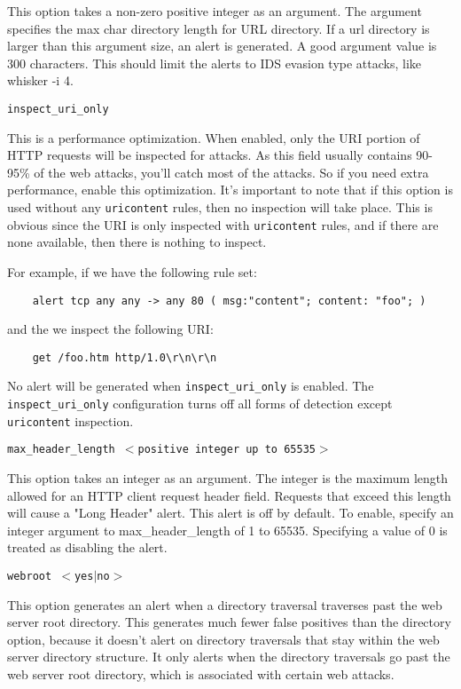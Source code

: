 \documentclass[english]{report}
\newcounter{slistnum}
\newenvironment{slist}
{ \begin{list}{ {\bf \arabic{slistnum}.} }{\usecounter{slistnum} } }
{ \end{list} }
\begin{document}
\begin{slist}
This option takes a non-zero positive integer as an argument.  The argument
specifies the max char directory length for URL directory.  If a url directory
is larger than this argument size, an alert is generated. A good argument value
is 300 characters.  This should limit the alerts to IDS evasion type attacks,
like whisker -i 4.

\item \texttt{inspect\_uri\_only}

This is a performance optimization.  When enabled, only the URI portion of HTTP
requests will be inspected for attacks.  As this field usually contains 90-95\%
of the web attacks, you'll catch most of the attacks.  So if you need extra
performance, enable this optimization.  It's important to note that if this
option is used without any \texttt{uricontent} rules, then no inspection will
take place.  This is obvious since the URI is only inspected with
\texttt{uricontent} rules, and if there are none available, then there is
nothing to inspect.

For example, if we have the following rule set:

\begin{verbatim}
    alert tcp any any -> any 80 ( msg:"content"; content: "foo"; )
\end{verbatim}

and the we inspect the following URI:

\begin{verbatim}
    get /foo.htm http/1.0\r\n\r\n
\end{verbatim}

No alert will be generated when \texttt{inspect\_uri\_only} is enabled.  The
\texttt{inspect\_uri\_only} configuration turns off all forms of detection
except \texttt{uricontent} inspection.

\item \texttt{max\_header\_length $<$positive integer up to 65535$>$}

This option takes an integer as an argument.  The integer is the maximum length
allowed for an HTTP client request header field.  Requests that exceed this
length will cause a "Long Header" alert.  This alert is off by default.  To
enable, specify an integer argument to max\_header\_length of 1 to 65535.
Specifying a value of 0 is treated as disabling the alert.

\item \texttt{webroot $<$yes$|$no$>$}

This option generates an alert when a directory traversal traverses past the
web server root directory.  This generates much fewer false positives than the
directory option, because it doesn't alert on directory traversals that stay
within the web server directory structure.  It only alerts when the directory
traversals go past the web server root directory, which is associated with
certain web attacks.


\end{slist}
\end{document}
